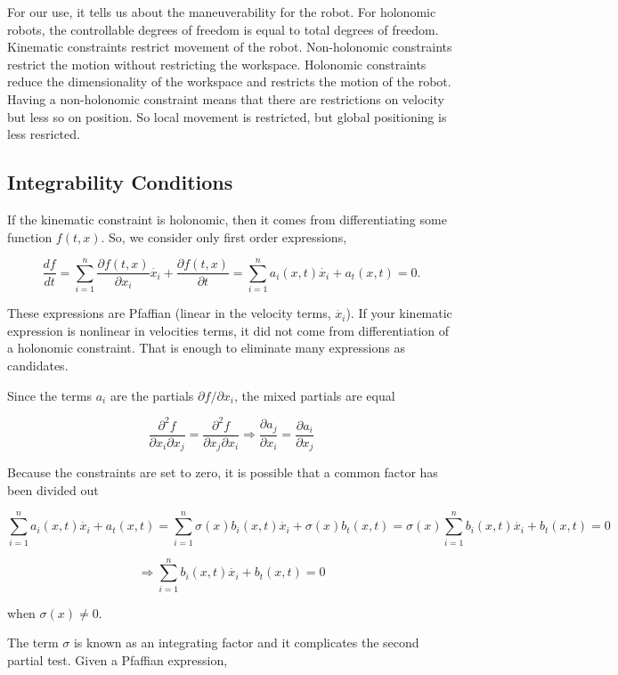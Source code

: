 For our use, it tells us about the maneuverability for the robot. For
holonomic robots, the controllable degrees of freedom is equal to total
degrees of freedom. Kinematic constraints restrict movement of the
robot. Non-holonomic constraints restrict the motion without restricting
the workspace. Holonomic constraints reduce the dimensionality of the
workspace and restricts the motion of the robot. Having a non-holonomic
constraint means that there are restrictions on velocity but less so on
position. So local movement is restricted, but global positioning is
less resricted.

\hypertarget{integrability-conditions}{%
\subsection{Integrability Conditions}\label{integrability-conditions}}

If the kinematic constraint is holonomic, then it comes from
differentiating some function \(f(t,x)\). So, we consider only first
order expressions,

\[\frac{df}{dt} = \sum_{i=1}^{n} \frac{\partial f(t,x)}{\partial x_i} \dot{x_i}
+ \frac{\partial f(t,x)}{\partial t}
= \sum_{i=1}^{n} a_i (x,t) \dot{x_i} + a_t(x,t) =0.\]

These expressions are Pfaffian (linear in the velocity terms,
\(\dot{x_i}\)). If your kinematic expression is nonlinear in velocities
terms, it did not come from differentiation of a holonomic constraint.
That is enough to eliminate many expressions as candidates.

Since the terms \(a_i\) are the partials \(\partial f / \partial x_i\),
the mixed partials are equal

\[\frac{\partial^2 f}{\partial x_i \partial x_j}
= \frac{\partial^2 f}{\partial x_j \partial x_i} \Rightarrow
\frac{\partial a_j}{\partial x_i} = \frac{\partial a_i}{\partial x_j}\]

Because the constraints are set to zero, it is possible that a common
factor has been divided out

\[\sum_{i=1}^{n} a_i (x,t) \dot{x_i} + a_t(x,t)
= \sum_{i=1}^{n} \sigma(x) b_i (x,t) \dot{x_i} + \sigma(x) b_t(x,t)
= \sigma(x) \sum_{i=1}^{n} b_i (x,t) \dot{x_i} + b_t(x,t) = 0\]

\[\Rightarrow  \sum_{i=1}^{n} b_i (x,t) \dot{x_i} + b_t(x,t) = 0\]

when \(\sigma(x) \neq 0\).

The term \(\sigma\) is known as an integrating factor and it complicates
the second partial test. Given a Pfaffian expression,


